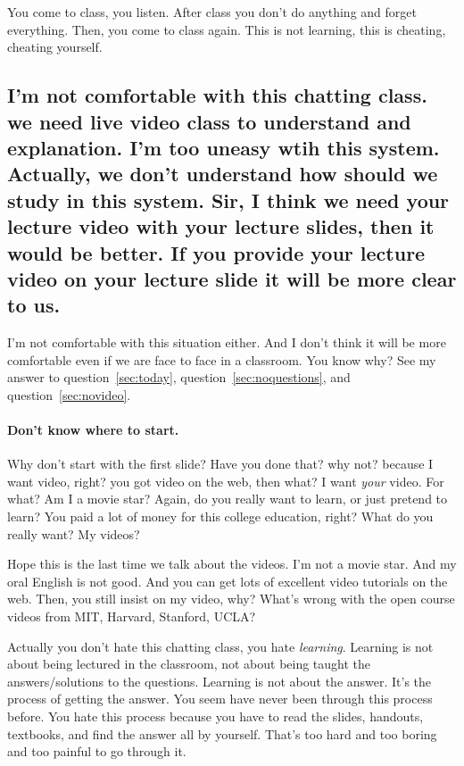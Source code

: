 \documentclass{article}
\begin{document}
You come to class, you listen. After class you don't do anything and forget everything.
Then, you come to class again. This is not learning, this is cheating, cheating yourself.

\subsection[Not comfortable with chatting class?]{I'm not comfortable with this chatting
  class. we need live video class to understand and explanation. I'm too uneasy wtih this
  system. Actually, we don't understand how should we study in this system. Sir, I think
  we need your lecture video with your lecture slides, then it would be better. If you
  provide your lecture video on your lecture slide it will be more clear to us.}
\label{sec:comfortable}

I'm not comfortable with this situation either. And I don't think it will be
more comfortable even if we are face to face in a classroom. You know why? See my answer
to question~\ref{sec:today}, question~\ref{sec:noquestions}, and question~\ref{sec:novideo}.

\paragraph{Don't know where to start.}

Why don't start with the first slide?  Have you done that? why not? because I want video,
right? you got video on the web, then what? I want \emph{your} video. For what? Am I a movie
star? Again, do you really want to learn, or just pretend to learn? You paid a lot of
money for this college education, right? What do you really want? My videos?

Hope this is the last time we talk about the videos. I'm not a movie star. And my oral
English is not good. And you can get lots of excellent video tutorials on the web. Then,
you still insist on my video, why?  What's wrong with the open course videos from MIT,
Harvard, Stanford, UCLA?

Actually you don't hate this chatting class, you hate \emph{learning}. Learning is not
about being lectured in the classroom, not about being taught the answers/solutions to the
questions. Learning is not about the answer. It's the process of getting the answer.  You
seem have never been through this process before. You hate this process because you
have to read the slides, handouts, textbooks, and find the answer all by yourself. That's
too hard and too boring and too painful to go through it.
\end{document}

